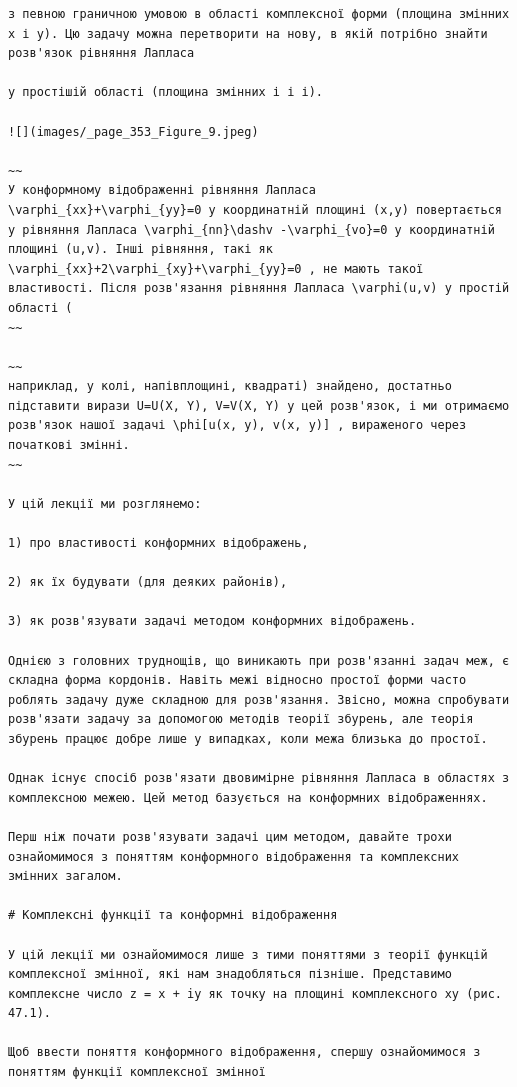 \documentclass[
  ukrainian,
]{article}
\begin{document}
\begin{verbatim}
з певною граничною умовою в області комплексної форми (площина змінних x і y). Цю задачу можна перетворити на нову, в якій потрібно знайти розв'язок рівняння Лапласа

у простішій області (площина змінних і і і).

![](images/_page_353_Figure_9.jpeg)

~~
У конформному відображенні рівняння Лапласа \varphi_{xx}+\varphi_{yy}=0 у координатній площині (x,y) повертається у рівняння Лапласа \varphi_{nn}\dashv -\varphi_{vo}=0 у координатній площині (u,v). Інші рівняння, такі як \varphi_{xx}+2\varphi_{xy}+\varphi_{yy}=0 , не мають такої властивості. Після розв'язання рівняння Лапласа \varphi(u,v) у простій області (
~~

~~
наприклад, у колі, напівплощині, квадраті) знайдено, достатньо підставити вирази U=U(X, Y), V=V(X, Y) у цей розв'язок, і ми отримаємо розв'язок нашої задачі \phi[u(x, y), v(x, y)] , вираженого через початкові змінні.
~~

У цій лекції ми розглянемо:

1) про властивості конформних відображень,

2) як їх будувати (для деяких районів),

3) як розв'язувати задачі методом конформних відображень.

Однією з головних труднощів, що виникають при розв'язанні задач меж, є складна форма кордонів. Навіть межі відносно простої форми часто роблять задачу дуже складною для розв'язання. Звісно, можна спробувати розв'язати задачу за допомогою методів теорії збурень, але теорія збурень працює добре лише у випадках, коли межа близька до простої.

Однак існує спосіб розв'язати двовимірне рівняння Лапласа в областях з комплексною межею. Цей метод базується на конформних відображеннях.

Перш ніж почати розв'язувати задачі цим методом, давайте трохи ознайомимося з поняттям конформного відображення та комплексних змінних загалом.

# Комплексні функції та конформні відображення

У цій лекції ми ознайомимося лише з тими поняттями з теорії функцій комплексної змінної, які нам знадобляться пізніше. Представимо комплексне число z = x + iy як точку на площині комплексного xy (рис. 47.1).

Щоб ввести поняття конформного відображення, спершу ознайомимося з поняттям функції комплексної змінної


\end{verbatim}
\end{document}
